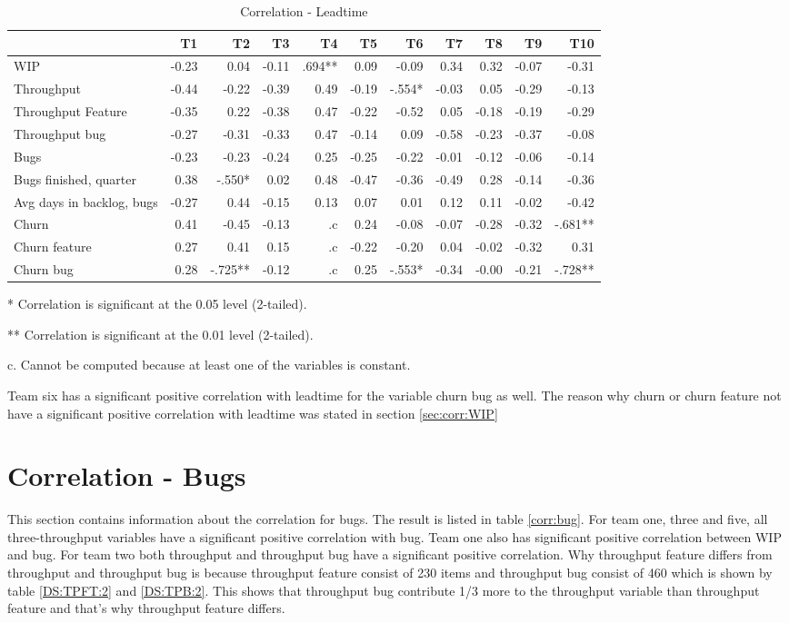 \documentclass[UKenglish]{ifimaster}  %
\begin{document}
\begin{table}[!htbp]
 \centering
 \begin{tabular}{|l|r|r|r|r|r|r|r|r|r|r|}
\hline
 & T1 & T2 & T3 & T4 & T5 & T6 & T7 & T8 & T9 & T10\\ \hline
WIP &-0.23& 0.04& -0.11& .694**& 0.09& -0.09& 0.34& 0.32& -0.07& -0.31\\ \hline
Throughput &-0.44& -0.22& -0.39& 0.49& -0.19& -.554*& -0.03& 0.05& -0.29& -0.13\\ \hline
Throughput Feature &-0.35& 0.22& -0.38& 0.47& -0.22& -0.52& 0.05& -0.18& -0.19& -0.29\\ \hline
Throughput bug &-0.27& -0.31& -0.33& 0.47& -0.14& 0.09& -0.58& -0.23& -0.37& -0.08\\ \hline
Bugs &-0.23& -0.23& -0.24& 0.25& -0.25& -0.22& -0.01& -0.12& -0.06& -0.14\\ \hline
Bugs finished, quarter &0.38& -.550*& 0.02& 0.48& -0.47& -0.36& -0.49& 0.28& -0.14& -0.36\\ \hline
Avg days in backlog, bugs &-0.27& 0.44& -0.15& 0.13& 0.07& 0.01& 0.12& 0.11& -0.02& -0.42\\ \hline
Churn &0.41& -0.45& -0.13& .c& 0.24& -0.08& -0.07& -0.28& -0.32& -.681**\\ \hline
Churn feature &0.27& 0.41& 0.15& .c& -0.22& -0.20& 0.04& -0.02& -0.32& 0.31\\ \hline
Churn bug &0.28& -.725**
& -0.12& .c
& 0.25& -.553*
& -0.34& -0.00& -0.21& -.728**
\\ \hline
\end{tabular}
 \caption{Correlation - Leadtime}
 \label{corr:Leadtime}
 \centerline {* Correlation is significant at the 0.05 level (2-tailed).}
\centerline{** Correlation is significant at the 0.01 level (2-tailed).}
\centerline{c. Cannot be computed because at least one of the variables is constant.}
\end{table}
Team six has a significant positive correlation with leadtime for the variable churn bug as well. The reason why churn or churn feature not have a significant positive correlation with leadtime was stated in section \ref{sec:corr:WIP}
\section{Correlation - Bugs}
\label{sec:corr:bug}

This section contains information about the correlation for bugs. The result is listed in table \ref{corr:bug}. For team one, three and five, all three-throughput variables have a significant positive correlation with bug. Team one also has significant positive correlation between WIP and bug. For team two both throughput and throughput bug have a significant positive correlation. 
Why throughput feature differs from throughput and throughput bug is because throughput feature consist of 230 items and throughput bug consist of 460 which is shown by table \ref{DS:TPFT:2} and \ref{DS:TPB:2}. This shows that throughput bug contribute 1/3 more to the throughput variable than throughput feature and that's why throughput feature differs. 
\end{document}
